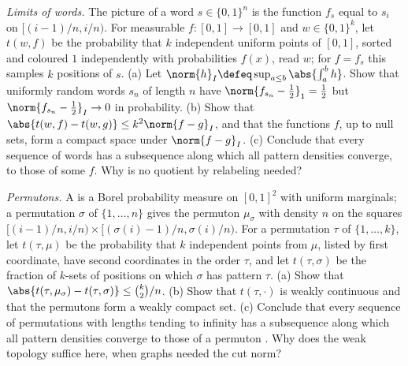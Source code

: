 \begin{refsection}
\begin{exercises}
\item \transfer\label{ex:graphon:words} \emph{Limits of words.} The picture of a word $s\in\{0,1\}^n$ is the function $f_s$ equal to $s_i$ on $[(i-1)/n,i/n)$. For measurable $f\colon[0,1]\to[0,1]$ and $w\in\{0,1\}^k$, let $t(w,f)$ be the probability that $k$ independent uniform points of $[0,1]$, sorted and coloured $1$ independently with probabilities $f(x)$, read $w$; for $f=f_s$ this samples $k$ positions of $s$. (a) Let $\norm{h}_I\defeq\sup_{a\le b}\abs{\int_a^bh}$. Show that uniformly random words $s_n$ of length $n$ have $\norm{f_{s_n}-\tfrac12}_1=\tfrac12$ but $\norm{f_{s_n}-\tfrac12}_I\to0$ in probability. (b) Show that $\abs{t(w,f)-t(w,g)}\le k^2\norm{f-g}_I$, and that the functions $f$, up to null sets, form a compact space under $\norm{f-g}_I$. (c) Conclude that every sequence of words has a subsequence along which all pattern densities converge, to those of some $f$. Why is no quotient by relabeling needed?

\item \transfer\hard\label{ex:graphon:permutons} \emph{Permutons.} A  is a Borel probability measure on $[0,1]^2$ with uniform marginals; a permutation $\sigma$ of $\{1,\dots,n\}$ gives the permuton $\mu_\sigma$ with density $n$ on the squares $[(i-1)/n,i/n)\times[(\sigma(i)-1)/n,\sigma(i)/n)$. For a permutation $\tau$ of $\{1,\dots,k\}$, let $t(\tau,\mu)$ be the probability that $k$ independent points from $\mu$, listed by first coordinate, have second coordinates in the order $\tau$, and let $t(\tau,\sigma)$ be the fraction of $k$-sets of positions on which $\sigma$ has pattern $\tau$. (a) Show that $\abs{t(\tau,\mu_\sigma)-t(\tau,\sigma)}\le\binom k2/n$. (b) Show that $t(\tau,\cdot)$ is weakly continuous and that the permutons form a weakly compact set. (c) Conclude that every sequence of permutations with lengths tending to infinity has a subsequence along which all pattern densities converge to those of a permuton \parencite{HoppenEtAl2013}. Why does the weak topology suffice here, when graphs needed the cut norm? 


\end{exercises}
\end{refsection}
